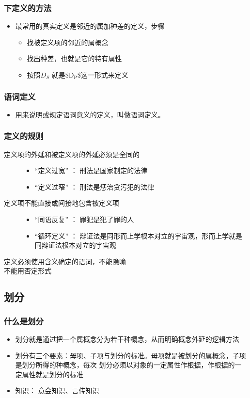 \documentclass[11pt]{article}
\begin{document}
\subsubsection{下定义的方法}
\label{sec-3-2-2}
\begin{itemize}
\item 最常用的真实定义是邻近的属加种差的定义，步骤
\begin{itemize}
\item 找被定义项的邻近的属概念
\item 找出种差，也就是它的特有属性
\item 按照$D_S$ 就是\$D$_{\text{P}}$\$这一形式来定义
\end{itemize}
\end{itemize}
\subsubsection{语词定义}
\label{sec-3-2-3}
\begin{itemize}
\item 用来说明或规定语词意义的定义，叫做语词定义。
\end{itemize}
\subsubsection{定义的规则}
\label{sec-3-2-4}
\begin{description}
\item[{定义项的外延和被定义项的外延必须是全同的}] \begin{itemize}
\item “定义过宽” ： 刑法是国家制定的法律
\item “定义过窄” ： 刑法是惩治贪污犯的法律
\end{itemize}
\item[{定义项不能直接或间接地包含被定义项}] \begin{itemize}
\item “同语反复” ： 罪犯是犯了罪的人
\item “循环定义” ： 辩证法是同形而上学根本对立的宇宙观，形而上学就是同辩证法根本对立的宇宙观
\end{itemize}
\item[{定义必须使用含义确定的语词，不能隐喻}]
\item[{不能用否定形式}]
\end{description}
\subsection{划分}
\label{sec-3-3}
\subsubsection{什么是划分}
\label{sec-3-3-1}
\begin{itemize}
\item 划分就是通过把一个属概念分为若干种概念，从而明确概念外延的逻辑方法
\item 划分有三个要素：母项、子项与划分的标准。母项就是被划分的属概念，子项是划分所得的种概念，每次
划分必须以对象的一定属性作根据，作根据的一定属性就是划分的标准
\item 知识： 意会知识、言传知识
\end{itemize}
\end{document}
